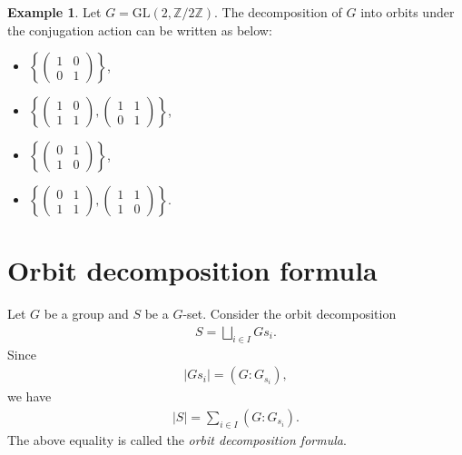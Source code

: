 \documentclass[12pt]{report}
\theoremstyle{plain}
\theoremstyle{remark}
\theoremstyle{definition}
\newtheorem{example}[theorem]{Example}
\newcommand{\Z}{\mathbb{Z}}
\begin{document}
\begin{example}
    Let $G=\mathrm{GL}(2,\Z/2\Z)$. The decomposition of $G$ into orbits under the conjugation action can be written as below:
    \begin{itemize}
        \item $\left\{\begin{pmatrix}
            1 & 0 \\ 0 & 1
        \end{pmatrix}\right\}$,
        \item $\left\{\begin{pmatrix}
            1 & 0 \\ 1 & 1
        \end{pmatrix}, \begin{pmatrix}
            1 & 1 \\ 0 & 1
        \end{pmatrix}\right\}$,
        \item $\left\{\begin{pmatrix}
            0 & 1 \\ 1 & 0
        \end{pmatrix}\right\}$,
        \item $\left\{\begin{pmatrix}
            0 & 1 \\ 1 & 1
        \end{pmatrix}, \begin{pmatrix}
            1 & 1 \\ 1 & 0
        \end{pmatrix}\right\}$.
    \end{itemize}
\end{example}


\section{Orbit decomposition formula}
Let $G$ be a group and $S$ be a $G$-set. Consider the orbit decomposition
\begin{align*}
    S = \bigsqcup_{i\in I} Gs_i.
\end{align*}
Since
\begin{align*}
    |Gs_i|=(G:G_{s_i}),
\end{align*}
we have
\begin{align*}
    |S|=\sum_{i\in I} (G:G_{s_i}).
\end{align*}
The above equality is called the \emph{orbit decomposition formula}.\\
\end{document}
